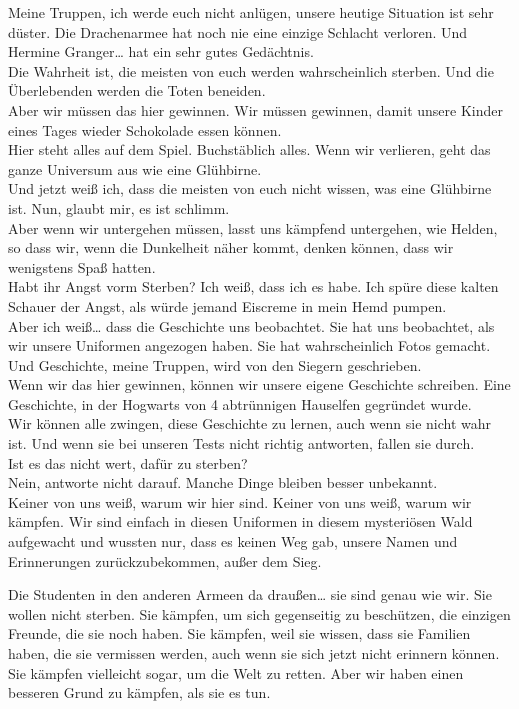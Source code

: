 {Meine Truppen, ich werde euch nicht anlügen, unsere heutige Situation ist sehr düster. Die Drachenarmee hat noch nie eine einzige Schlacht verloren. Und Hermine Granger… hat ein sehr gutes Gedächtnis.\\ Die Wahrheit ist, die meisten von euch werden wahrscheinlich sterben. Und die Überlebenden werden die Toten beneiden.\\ Aber wir müssen das hier gewinnen. Wir müssen gewinnen, damit unsere Kinder eines Tages wieder Schokolade essen können.\\ Hier steht alles auf dem Spiel. Buchstäblich alles. Wenn wir verlieren, geht das ganze Universum aus wie eine Glühbirne.\\ Und jetzt weiß ich, dass die meisten von euch nicht wissen, was eine Glühbirne ist. Nun, glaubt mir, es ist schlimm.\\ Aber wenn wir untergehen müssen, lasst uns kämpfend untergehen, wie Helden, so dass wir, wenn die Dunkelheit näher kommt, denken können, dass wir wenigstens Spaß hatten.\\ Habt ihr Angst vorm Sterben? Ich weiß, dass ich es habe. Ich spüre diese kalten Schauer der Angst, als würde jemand Eiscreme in mein Hemd pumpen.\\ Aber ich weiß… dass die Geschichte uns beobachtet. Sie hat uns beobachtet, als wir unsere Uniformen angezogen haben. Sie hat wahrscheinlich Fotos gemacht. Und Geschichte, meine Truppen, wird von den Siegern geschrieben.\\ Wenn wir das hier gewinnen, können wir unsere eigene Geschichte schreiben. Eine Geschichte, in der Hogwarts von 4 abtrünnigen Hauselfen gegründet wurde.\\ Wir können alle zwingen, diese Geschichte zu lernen, auch wenn sie nicht wahr ist. Und wenn sie bei unseren Tests nicht richtig antworten, fallen sie durch.\\ Ist es das nicht wert, dafür zu sterben?\\ Nein, antworte nicht darauf. Manche Dinge bleiben besser unbekannt.\\ Keiner von uns weiß, warum wir hier sind. Keiner von uns weiß, warum wir kämpfen. Wir sind einfach in diesen Uniformen in diesem mysteriösen Wald aufgewacht und wussten nur, dass es keinen Weg gab, unsere Namen und Erinnerungen zurückzubekommen, außer dem Sieg.

Die Studenten in den anderen Armeen da draußen… sie sind genau wie wir. Sie wollen nicht sterben. Sie kämpfen, um sich gegenseitig zu beschützen, die einzigen Freunde, die sie noch haben. Sie kämpfen, weil sie wissen, dass sie Familien haben, die sie vermissen werden, auch wenn sie sich jetzt nicht erinnern können.\\ Sie kämpfen vielleicht sogar, um die Welt zu retten. Aber wir haben einen besseren Grund zu kämpfen, als sie es tun.

}
